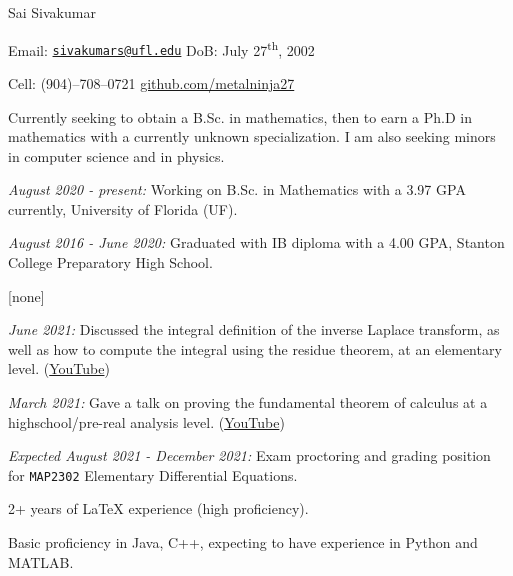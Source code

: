 \documentclass[11pt]{article}
\begin{document}
{\huge Sai Sivakumar}

Email: \href{mailto:sivakumars@ufl.edu}{\texttt{sivakumars@ufl.edu}}\hspace{5cm} DoB: July 27\textsuperscript{th}, 2002

Cell: (904)--708--0721\hspace{6.3cm} \href{https://github.com/metalninja27}{github.com/metalninja27} \\

\noindent{}

Currently seeking to obtain a B.Sc. in mathematics, then to earn a Ph.D in mathematics with a currently unknown specialization. I am also seeking minors in computer science and in physics.

\noindent{}

\textsl{August 2020 - present:} Working on B.Sc. in Mathematics with a 3.97 GPA currently, University of Florida (UF).

\textsl{August 2016 - June 2020:} Graduated with IB diploma with a 4.00 GPA, Stanton College Preparatory High School.

\noindent{}

[none]

\noindent{}

\textsl{June 2021:} Discussed the integral definition of the inverse Laplace transform, as well as how to compute the integral using the residue theorem, at an elementary level. ({\color{blue}\href{https://youtu.be/20Xbrit2chw}{YouTube}})

\textsl{March 2021:} Gave a talk on proving the fundamental theorem of calculus at a highschool/pre-real analysis level. ({\color{blue}\href{https://youtu.be/l4GO-n-2ETQ}{YouTube}})

\noindent{}

\textsl{Expected August 2021 - December 2021:} Exam proctoring and grading position for \texttt{MAP2302} Elementary Differential Equations.

\noindent{}

2+ years of \LaTeX\hspace{1pt} experience (high proficiency).

Basic proficiency in Java, C++, expecting to have experience in Python and MATLAB. 
\end{document}
